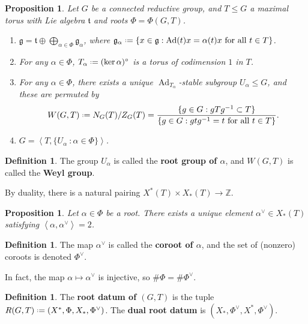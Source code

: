 \documentclass[11pt]{report}
\let\mf\mathfrak
\newcommand{\1}{\mathbbm 1}
\newcommand{\Z}{\mathbb{Z}}
\newcommand*{\defeq}{\mathrel{\vcenter{\baselineskip0.5ex \lineskiplimit0pt
      \hbox{\scriptsize.}\hbox{\scriptsize.}}}%
  =}
\DeclareMathOperator{\Ad}{Ad}
\theoremstyle{plain}
\newcounter{ex}
\newtheorem{prop}[thm]{Proposition}
\theoremstyle{definition}
\newtheorem{mydef}[thm]{Definition}
\theoremstyle{remark}
\numberwithin{equation}{section}
\begin{document}
\begin{prop}
  Let $G$ be a connected reductive group, and $T \le G$ a maximal torus with Lie algebra $\mf t$ and roots $\Phi = \Phi(G,T)$.

  \begin{enumerate}
  \item $\mf g = \mf t \oplus \bigoplus_{\alpha \in \Phi} \mf g_{\alpha}$, where $\mf g_{\alpha} \defeq \{ x \in \mf g : \Ad(t)x = \alpha(t)x \text{ for all } t \in T\}$.
  \item For any $\alpha \in \Phi$,
    $T_{\alpha} \defeq (\ker \alpha)^{\circ}$ is a torus of codimension $1$ in $T$. 
  \item For any $\alpha \in \Phi$, there exists a unique
    $\Ad_{T_{\alpha}}$-stable subgroup $U_{\alpha} \le G$, and these are permuted by
    \begin{equation}
      W(G,T) \defeq N_{G}(T)/Z_{G}(T) = \frac{\{ g \in G : gTg^{-1} \subset T \}}{\{g \in G : gtg^{-1} = t \text{ for all } t \in T\}}.
    \end{equation}
    
  \item $G = \left\langle T, \{U_{\alpha}\ : \alpha \in \Phi\} \right\rangle$.
    
  \end{enumerate}
\end{prop}

\begin{mydef}
  The group $U_{\alpha}$ is called the \textbf{root group of
    $\alpha$}, and $W(G,T)$ is called the \textbf{Weyl group}.
\end{mydef}

By duality, there is a natural pairing $X^{*}(T)\times X_{*}(T) \to \Z$. 
\begin{prop}
  Let $\alpha \in \Phi$ be a root. There exists a unique element
  $\alpha^{\vee} \in X_{*}(T)$ satisfying
  $\left\langle \alpha,\alpha^{\vee}\right\rangle =2$.
\end{prop}
\begin{mydef}
  The map $\alpha^{\vee}$ is called the \textbf{coroot of $\alpha$}, and the set of (nonzero) coroots is denoted $\Phi^{\vee}$. 
\end{mydef}
In fact, the map $\alpha \mapsto \alpha^{\vee}$ is injective, so $\# \Phi = \# \Phi^{\vee}$.

\begin{mydef}
  The \textbf{root datum of $(G,T)$} is the tuple $R(G,T)\defeq (X^{*}, \Phi, X_{*},\Phi^{\vee})$. The \textbf{dual root datum} is $(X_{*},\Phi^{\vee},X^{*},\Phi^{\vee})$.
\end{mydef}
\end{document}
